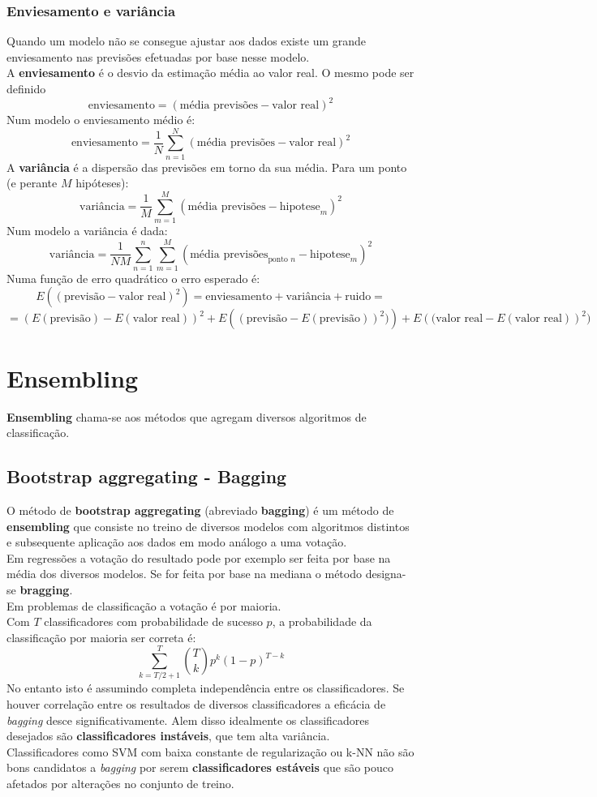 \documentclass[]{report}
\begin{document}
\subsection{Enviesamento e variância}
Quando um modelo não se consegue ajustar aos dados existe um grande enviesamento nas previsões efetuadas por base nesse modelo.\\
A \textbf{enviesamento} é o desvio da estimação média ao valor real. O mesmo pode ser definido
$$\text{enviesamento} = (\text{média previsões} - \text{valor real})^2$$
Num modelo o enviesamento médio é:
$$\text{enviesamento} = \frac{1}{N}\sum_{n=1}^N(\text{média previsões} - \text{valor real})^2$$
A \textbf{variância} é a dispersão das previsões em torno da sua média. Para um ponto (e perante $M$ hipóteses):
$$\text{variância} = \frac{1}{M}\sum_{m=1}^M (\text{média previsões} - \text{hipotese}_m)^2$$
Num modelo a variância é dada:
$$\text{variância} = \frac{1}{NM}\sum_{n=1}^n \sum_{m=1}^M (\text{média previsões}_{\text{ponto }n} - \text{hipotese}_m)^2$$
Numa função de erro quadrático o erro esperado é:
$$E((\text{previsão} - \text{valor real})^2) =\text{enviesamento} + \text{variância} + \text{ruido} =$$
$$= \left(E(\text{previsão}) - E(\text{valor real})\right)^2 +
E\left((\text{previsão}-E(\text{previsão}))^2)\right) +
E\left((\text{valor real}-E(\text{valor real})\right)^2)$$
\chapter{Ensembling}
\textbf{Ensembling} chama-se aos métodos que agregam diversos algoritmos de classificação.
\section{Bootstrap aggregating - Bagging}
O método de \textbf{bootstrap aggregating} (abreviado \textbf{bagging}) é um método de \textbf{ensembling} que consiste no treino de diversos modelos com algoritmos distintos e subsequente aplicação aos dados em modo análogo a uma votação.\\[2mm]
Em regressões a votação do resultado pode por exemplo ser feita por base na média dos diversos modelos. Se for feita por base na mediana o método designa-se \textbf{bragging}.\\[2mm]
Em problemas de classificação a votação é por maioria.\\
Com $T$ classificadores com probabilidade de sucesso $p$, a probabilidade da classificação por maioria ser correta é:
$$\sum_{k=T/2+1}^{T}\binom{T}{k} p^k (1-p)^{T-k}$$
No entanto isto é assumindo completa independência entre os classificadores. Se houver correlação entre os resultados de diversos classificadores a eficácia de \textit{bagging} desce significativamente. Alem disso idealmente os classificadores desejados são \textbf{classificadores instáveis}, que tem alta variância.\\
Classificadores como SVM com baixa constante de regularização ou k-NN não são bons candidatos a \textit{bagging} por serem \textbf{classificadores estáveis} que são pouco afetados por alterações no conjunto de treino.
\clearpage
\end{document}
